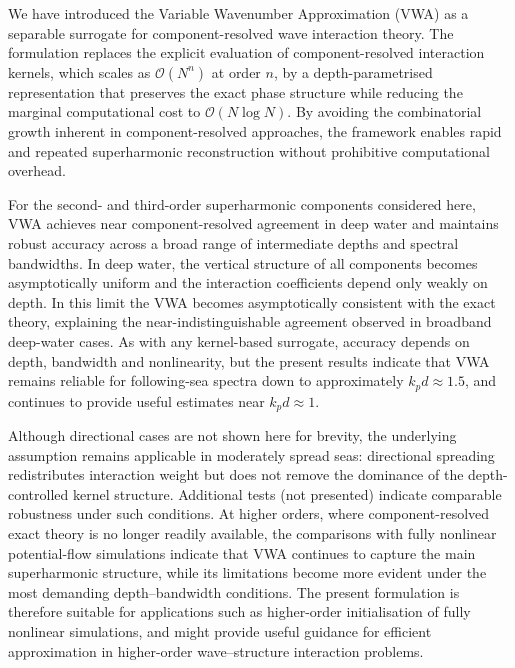 \documentclass[lineno]{JFM-FLM_Au}
\begin{document}
We have introduced the Variable Wavenumber Approximation (VWA) as a separable surrogate for component-resolved wave interaction theory. The formulation replaces the explicit evaluation of component-resolved interaction kernels, which scales as $\mathcal{O}(N^n)$ at order $n$, by a depth-parametrised representation that preserves the exact phase structure while reducing the marginal computational cost to $\mathcal{O}(N\log N)$. By avoiding the combinatorial growth inherent in component-resolved approaches, the framework enables rapid and repeated superharmonic reconstruction without prohibitive computational overhead.

For the second- and third-order superharmonic components considered here, VWA achieves near component-resolved agreement in deep water and maintains robust accuracy across a broad range of intermediate depths and spectral bandwidths. In deep water, the vertical structure of all components becomes asymptotically uniform and the interaction coefficients depend only weakly on depth. In this limit the VWA becomes asymptotically consistent with the exact theory, explaining the near-indistinguishable agreement observed in broadband deep-water cases. As with any kernel-based surrogate, accuracy depends on depth, bandwidth and nonlinearity, but the present results indicate that VWA remains reliable for following-sea spectra down to approximately $k_p d \approx 1.5$, and continues to provide useful estimates near $k_p d \approx 1$.

Although directional cases are not shown here for brevity, the underlying assumption remains applicable in moderately spread seas: directional spreading redistributes interaction weight but does not remove the dominance of the depth-controlled kernel structure. Additional tests (not presented) indicate comparable robustness under such conditions. At higher orders, where component-resolved exact theory is no longer readily available, the comparisons with fully nonlinear potential-flow simulations indicate that VWA continues to capture the main superharmonic structure, while its limitations become more evident under the most demanding depth--bandwidth conditions. The present formulation is therefore suitable for applications such as higher-order initialisation of fully nonlinear simulations, and might provide useful guidance for efficient approximation in higher-order wave--structure interaction problems.
\end{document}
